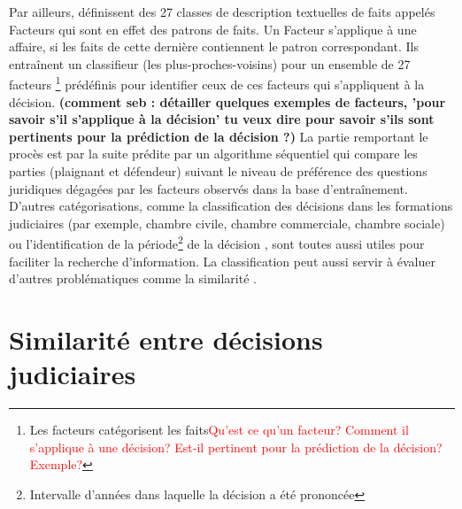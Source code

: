 Par ailleurs, \cite{Ashley2009classifCases} définissent des 27 classes de description textuelles de faits appelés \og Facteurs \fg{} qui sont en effet des patrons de faits. Un Facteur s'applique à une affaire, si les faits de cette dernière contiennent le patron correspondant.  Ils entraînent un classifieur (les plus-proches-voisins) pour un ensemble de 27 facteurs \footnote{Les facteurs catégorisent les faits\textcolor{red}{Qu'est ce qu'un facteur? Comment il s'applique à une décision? Est-il pertinent pour la prédiction de la décision? Exemple?}} prédéfinis pour identifier ceux de ces facteurs qui s'appliquent à la décision. \textbf{(comment seb : détailler quelques exemples de facteurs, 'pour savoir s'il s'applique à la décision' tu veux dire pour savoir s'ils sont pertinents pour la prédiction de la décision ?)} La partie remportant le procès est par la suite prédite par un algorithme séquentiel qui compare les parties (plaignant et défendeur) suivant le niveau de préférence des questions juridiques dégagées par les facteurs observés dans la base d'entraînement. D'autres catégorisations, comme la classification des décisions dans les formations judiciaires (par exemple, chambre civile, chambre commerciale, chambre sociale) ou l'identification de la période\footnote{Intervalle d'années dans laquelle la décision a été prononcée} de la décision %
\citep{Sulea2017predictareadecision,sulea2017legalEnsSVM}, sont toutes aussi utiles pour faciliter la recherche d'information. La classification peut aussi servir à évaluer d'autres problématiques comme la similarité \citep{ma2018wmdchinesecase}.

\section{Similarité entre décisions judiciaires}


